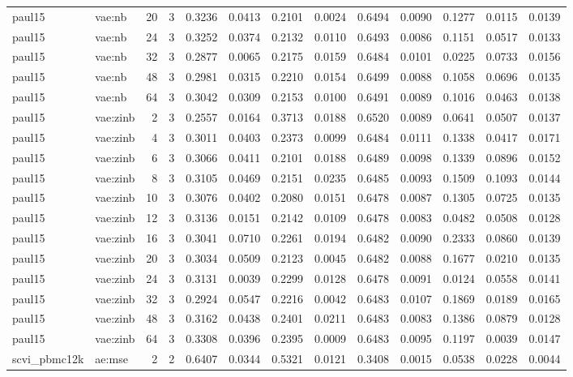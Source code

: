 \begin{tabular}{llrrrrrrrrrrr}
paul15 & vae:nb & 20 & 3 & 0.3236 & 0.0413 & 0.2101 & 0.0024 & 0.6494 & 0.0090 & 0.1277 & 0.0115 & 0.0139 \\
paul15 & vae:nb & 24 & 3 & 0.3252 & 0.0374 & 0.2132 & 0.0110 & 0.6493 & 0.0086 & 0.1151 & 0.0517 & 0.0133 \\
paul15 & vae:nb & 32 & 3 & 0.2877 & 0.0065 & 0.2175 & 0.0159 & 0.6484 & 0.0101 & 0.0225 & 0.0733 & 0.0156 \\
paul15 & vae:nb & 48 & 3 & 0.2981 & 0.0315 & 0.2210 & 0.0154 & 0.6499 & 0.0088 & 0.1058 & 0.0696 & 0.0135 \\
paul15 & vae:nb & 64 & 3 & 0.3042 & 0.0309 & 0.2153 & 0.0100 & 0.6491 & 0.0089 & 0.1016 & 0.0463 & 0.0138 \\
paul15 & vae:zinb & 2 & 3 & 0.2557 & 0.0164 & 0.3713 & 0.0188 & 0.6520 & 0.0089 & 0.0641 & 0.0507 & 0.0137 \\
paul15 & vae:zinb & 4 & 3 & 0.3011 & 0.0403 & 0.2373 & 0.0099 & 0.6484 & 0.0111 & 0.1338 & 0.0417 & 0.0171 \\
paul15 & vae:zinb & 6 & 3 & 0.3066 & 0.0411 & 0.2101 & 0.0188 & 0.6489 & 0.0098 & 0.1339 & 0.0896 & 0.0152 \\
paul15 & vae:zinb & 8 & 3 & 0.3105 & 0.0469 & 0.2151 & 0.0235 & 0.6485 & 0.0093 & 0.1509 & 0.1093 & 0.0144 \\
paul15 & vae:zinb & 10 & 3 & 0.3076 & 0.0402 & 0.2080 & 0.0151 & 0.6478 & 0.0087 & 0.1305 & 0.0725 & 0.0135 \\
paul15 & vae:zinb & 12 & 3 & 0.3136 & 0.0151 & 0.2142 & 0.0109 & 0.6478 & 0.0083 & 0.0482 & 0.0508 & 0.0128 \\
paul15 & vae:zinb & 16 & 3 & 0.3041 & 0.0710 & 0.2261 & 0.0194 & 0.6482 & 0.0090 & 0.2333 & 0.0860 & 0.0139 \\
paul15 & vae:zinb & 20 & 3 & 0.3034 & 0.0509 & 0.2123 & 0.0045 & 0.6482 & 0.0088 & 0.1677 & 0.0210 & 0.0135 \\
paul15 & vae:zinb & 24 & 3 & 0.3131 & 0.0039 & 0.2299 & 0.0128 & 0.6478 & 0.0091 & 0.0124 & 0.0558 & 0.0141 \\
paul15 & vae:zinb & 32 & 3 & 0.2924 & 0.0547 & 0.2216 & 0.0042 & 0.6483 & 0.0107 & 0.1869 & 0.0189 & 0.0165 \\
paul15 & vae:zinb & 48 & 3 & 0.3162 & 0.0438 & 0.2401 & 0.0211 & 0.6483 & 0.0083 & 0.1386 & 0.0879 & 0.0128 \\
paul15 & vae:zinb & 64 & 3 & 0.3308 & 0.0396 & 0.2395 & 0.0009 & 0.6483 & 0.0095 & 0.1197 & 0.0039 & 0.0147 \\
scvi\_pbmc12k & ae:mse & 2 & 2 & 0.6407 & 0.0344 & 0.5321 & 0.0121 & 0.3408 & 0.0015 & 0.0538 & 0.0228 & 0.0044 \\

\end{tabular}

